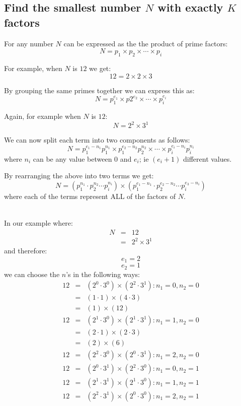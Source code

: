 \documentclass{article}
\begin{document}
\thispagestyle{empty}

\begin{center}
\section*{Find the smallest number $N$ with exactly $K$ factors}
\end{center}


For any number $N$ can be expressed as the the product of prime factors:
$$
N = p_1 \times p_2 \times \cdots \times p_i
$$

For example, when $N$ is $12$ we get:
$$
12 = 2 \times 2 \times 3
$$

By grouping the same primes together we can express this as:
$$
N = p_1 ^ {e_1} \times p2 ^ {e_2} \times 
\cdots \times p_i ^ {e_i}
$$

Again, for example when $N$ is $12$:
$$
N = 2 ^ 2 \times 3 ^ 1
$$

We can now split each term into two components as follows:
$$
N = 
p_1 ^ {e_1 - n_1} p_1 ^ {n_1} \times 
p_1 ^ {e_2 - n_2} p_2 ^ {n_2} \times 
\cdots \times 
p_i ^ {e_i - n_i} p_i ^ {n_i} 
$$
where $n_i$ can be any value between $0$ and $e_i$; ie $(e_i + 1)$ different values.

\par
By rearranging the above into two terms we get:
$$
N = 
( 
p_1 ^ {n_1} \cdot
p_2 ^ {n_2} 
\cdots 
p_i ^ {n_i}
)
\times
(
p_1 ^ {e_1 - n_1} \cdot
p_2 ^ {e_2 - n_2}
\cdots
p_i ^ {e_3 - n_i}
)
$$
where each of the terms represent ALL of the factors of $N$.
\\~
\par
In our example where:
\begin{eqnarray*}
N & = & 12\\
& = & 2 ^ 2 \times 3 ^ 1
\end{eqnarray*}
and therefore:
$$e_1 = 2$$
$$e_2 = 1$$
we can choose the $n$'s in the following ways:
\begin{eqnarray*}
12 &=& (2^0 \cdot 3^0) \times (2^2 \cdot 3^1) : n_1 = 0, n_2 = 0 \\
   &=& (1 \cdot 1) \times (4 \cdot 3) \\
   &=& (1) \times (12) \\
12 &=& (2^1 \cdot 3^0) \times (2^1 \cdot 3^1) : n_1 = 1, n_2 = 0\\
   &=& (2 \cdot 1) \times (2 \cdot 3) \\
   &=& (2) \times (6) \\
12 &=& (2^2 \cdot 3^0) \times (2^0 \cdot 3^1) : n_1 = 2, n_2 = 0\\
12 &=& (2^0 \cdot 3^1) \times (2^2 \cdot 3^0) : n_1 = 0, n_2 = 1\\
12 &=& (2^1 \cdot 3^1) \times (2^1 \cdot 3^0) : n_1 = 1, n_2 = 1\\
12 &=& (2^2 \cdot 3^1) \times (2^0 \cdot 3^0) : n_1 = 2, n_2 = 1\\
\end{eqnarray*}
\end{document}
